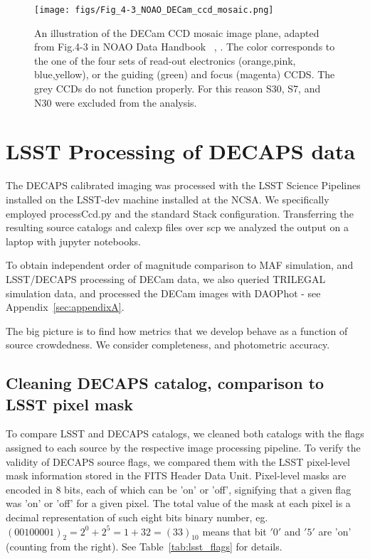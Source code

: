 \documentclass[DM,lsstdraft,toc,usenatbib]{lsstdoc}
\begin{document}
\begin{figure}
\texttt{[image: figs/Fig\_4-3\_NOAO\_DECam\_ccd\_mosaic.png]}
\caption{An illustration of the DECam CCD mosaic image plane, adapted from Fig.4-3 in NOAO Data Handbook ~\citep{shaw2015}, . The color corresponds to the one of the four sets of read-out electronics (orange,pink, blue,yellow), or the guiding (green) and focus (magenta) CCDS.  The grey CCDs do not function properly. For this reason  S30, S7, and N30 were excluded from the analysis. }
\label{fig:decam_mosaic_ccd}
\end{figure} 


\section{LSST Processing of DECAPS data}
\label{sec:LSST}
The DECAPS calibrated imaging was processed with the LSST Science Pipelines installed on the LSST-dev machine installed at the NCSA.  We specifically employed processCcd.py and the standard Stack configuration. Transferring the resulting source catalogs and calexp files over scp we analyzed the output on a laptop with jupyter notebooks. 


To obtain independent order of magnitude comparison to MAF simulation, and LSST/DECAPS processing of DECam data, we also queried TRILEGAL simulation data, and processed the DECam images  with DAOPhot - see Appendix~\ref{sec:appendixA}. 

The big picture is to find how metrics that we develop behave as a function of source crowdedness. We consider completeness, and photometric accuracy. 

\subsection{Cleaning DECAPS catalog, comparison to LSST pixel mask}
\label{sec:clean_decaps}
To compare LSST and DECAPS catalogs, we cleaned both catalogs with the flags assigned to each source by the respective image processing pipeline. To verify the validity of DECAPS source flags, we compared them with the LSST pixel-level mask information stored in the FITS Header Data Unit. Pixel-level masks are encoded in 8 bits,  each of which can be 'on' or 'off', signifying that a given flag was 'on' or 'off' for a given pixel. The total value of the mask at each pixel is a decimal representation of such eight bits binary number, eg.  $(00100001)_{2} = 2^{0} + 2^{5}  = 1 + 32 = (33)_{10} $ means that bit $'0'$ and $'5'$ are 'on' (counting from the right). See Table~\ref{tab:lsst_flags} for details. 
\end{document}
